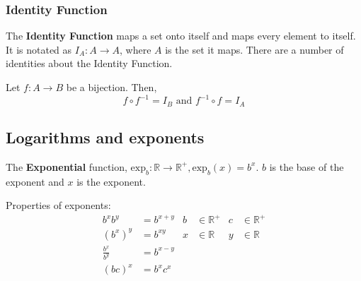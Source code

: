 \subsubsection*{Identity Function}

The \textbf{Identity Function} maps a set onto itself and maps every element to itself. It is notated as $I_A: A \rightarrow A$,
where $A$ is the set it maps. There are a number of identities about the Identity Function.

Let $f: A \rightarrow B$ be a bijection. Then,
\[
  f \circ f^{-1} = I_B \text{ and } f^{-1} \circ f = I_A
\]

\subsection{Logarithms and exponents}

The \textbf{Exponential} function, $\text{exp}_b: \mathbb{R} \rightarrow \mathbb{R}^+, \text{exp}_b(x) = b^x$.
$b$ is the base of the exponent and $x$ is the exponent.

Properties of exponents:
\begin{align*}
  b^{x}b^{y}      & = b^{x+y} & b & \in \mathbb{R}^+ & c & \in \mathbb{R}^+ \\
  (b^x)^{y}       & = b^{xy}  & x & \in \mathbb{R}   & y & \in \mathbb{R}   \\
  \frac{b^x}{b^y} & = b^{x-y}                                               \\
  (bc)^x          & = b^xc^x
\end{align*}

\begin{center}
\end{center}

